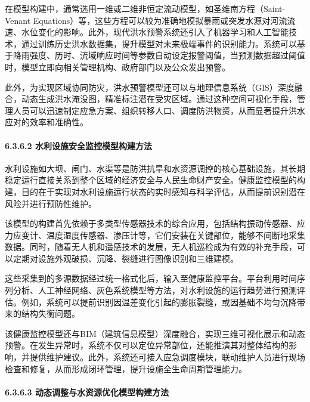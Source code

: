 在模型构建中，通常选用一维或二维非恒定流动模型，如圣维南方程（Saint-Venant Equations）等，这些方程可以较为准确地模拟暴雨或突发水源对河流流速、水位变化的影响。此外，现代洪水预警系统还引入了机器学习和人工智能技术，通过训练历史洪水数据集，提升模型对未来极端事件的识别能力。系统可以基于降雨强度、历时、流域响应时间等参数自动设定报警阈值，当预测数据超过阈值时，模型立即向相关管理机构、政府部门以及公众发出预警。

此外，为实现区域协同防灾，洪水预警模型还可以与地理信息系统（GIS）深度融合，动态生成洪水淹没图，精准标注潜在受灾区域。通过这种空间可视化手段，管理人员可以迅速制定应急方案、组织转移人口、调度防洪物资，从而显著提升洪水应对的效率和准确性。

\paragraph{6.3.6.2 水利设施安全监控模型构建方法}\label{ux6c34ux5229ux8bbeux65bdux5b89ux5168ux76d1ux63a7ux6a21ux578bux6784ux5efaux65b9ux6cd5}

水利设施如大坝、闸门、水渠等是防洪抗旱和水资源调控的核心基础设施，其长期稳定运行直接关系到整个区域的经济安全与人民生命财产安全。健康监控模型的构建，目的在于实现对水利设施运行状态的实时感知与科学评估，从而提前识别潜在风险并进行预防性维护。

该模型的构建首先依赖于多类型传感器技术的综合应用，包括结构振动传感器、应力应变计、温度湿度传感器、渗压计等，它们安装在关键部位，能够不间断地采集数据。同时，随着无人机和遥感技术的发展，无人机巡检成为有效的补充手段，可以定期对设施外观破损、沉降、裂缝进行图像识别和三维建模。

这些采集到的多源数据经过统一格式化后，输入至健康监控平台。平台利用时间序列分析、人工神经网络、灰色系统模型等方法，对水利设施的运行趋势进行预测评估。例如，系统可以提前识别因温差变化引起的膨胀裂缝，或因基础不均匀沉降带来的结构失衡问题。

该健康监控模型还与BIM（建筑信息模型）深度融合，实现三维可视化展示和动态预警。在发生异常时，系统不仅可以定位异常部位，还能推演其对整体结构的影响，并提供维护建议。此外，系统还可接入应急调度模块，联动维护人员进行现场检查和修复，从而形成闭环管理，提升设施全生命周期管理能力。

\paragraph{6.3.6.3 动态调整与水资源优化模型构建方法}\label{ux52a8ux6001ux8c03ux6574ux4e0eux6c34ux8d44ux6e90ux4f18ux5316ux6a21ux578bux6784ux5efaux65b9ux6cd5}

